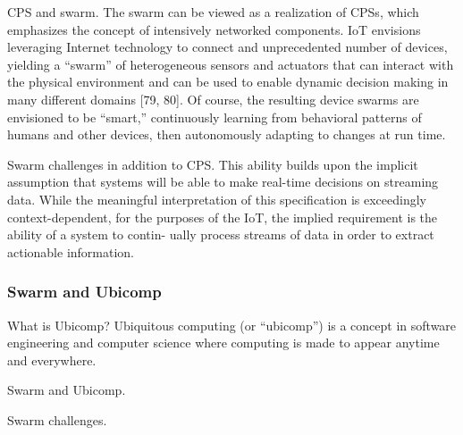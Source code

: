 CPS and swarm. The swarm can be viewed as a realization of CPSs, which
emphasizes the concept of intensively networked components. IoT envisions
leveraging Internet technology to connect and unprecedented number of devices,
yielding a ``swarm'' of heterogeneous sensors and actuators that can interact
with the physical environment and can be used to enable dynamic decision making
in many different domains [79, 80]. Of course, the resulting device swarms are
envisioned to be ``smart,'' continuously learning from behavioral patterns of
humans and other devices, then autonomously adapting to changes at run time.

Swarm challenges in addition to CPS. This ability builds upon the implicit
assumption that systems will be able to make real-time decisions on streaming
data. While the meaningful interpretation of this specification is exceedingly
context-dependent, for the purposes of the IoT, the implied requirement is the
ability of a system to contin- ually process streams of data in order to extract
actionable information.

\subsubsection{Swarm and Ubicomp}
\label{sec:swarm-wsn}

What is Ubicomp? Ubiquitous computing (or ``ubicomp'') is a concept in software
engineering and computer science where computing is made to appear anytime and
everywhere.

Swarm and Ubicomp.

Swarm challenges.

